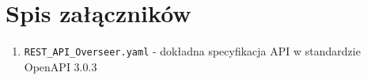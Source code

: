 \documentclass[a4paper,11pt,twoside]{report}
\theoremstyle{definition}
\begin{document}



\thispagestyle{empty}





\listoffigures
\thispagestyle{empty}


\renewcommand{\listtablename}{Spis tabel}
\listoftables
\thispagestyle{empty}



\chapter*{Spis załączników}
\begin{enumerate}
  \item \texttt{REST\_API\_Overseer.yaml} - dokładna specyfikacja API w standardzie OpenAPI
        3.0.3
\end{enumerate}
\thispagestyle{empty}
\end{document}
